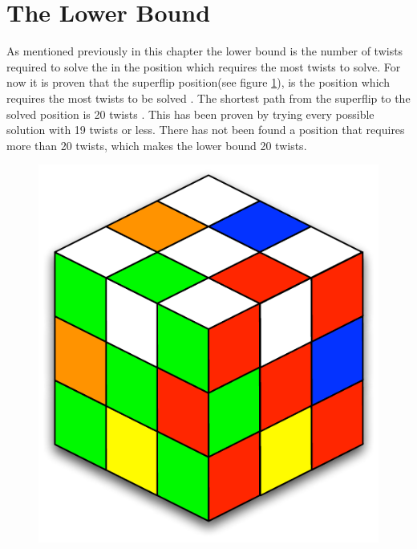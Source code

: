 \section{The Lower Bound}
As mentioned previously in this chapter the lower bound is the number of twists required to solve the \rubik{} in the position which requires the most twists to solve. 
For now it is proven that the superflip position(see figure \ref{fig:superflip}), is the position which requires the most twists to be solved \cite{speedsolving.wiki}.
The shortest path from the superflip to the solved position is 20 twists \cite{rokicki09}.
This has been proven by trying every possible solution with 19 twists or less. 
There has not been found a position that requires more than 20 twists, which makes the lower bound 20 twists.


\begin{figure}[htbp]
	\centering
		\includegraphics[scale = 0.7]{input/pics/superflip.pdf}
	\caption{}
	\label{fig:superflip}
\end{figure}


